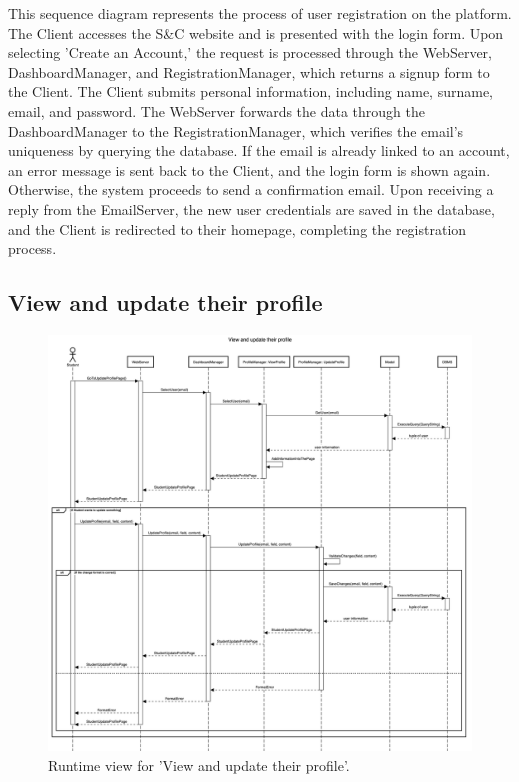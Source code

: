 This sequence diagram represents the process of user registration on the platform. The Client accesses the S\&C website and is presented with the login form. Upon selecting 'Create an Account,' the request is processed through the WebServer, DashboardManager, and RegistrationManager, which returns a signup form to the Client. The Client submits personal information, including name, surname, email, and password. The WebServer forwards the data through the DashboardManager to the RegistrationManager, which verifies the email’s uniqueness by querying the database. If the email is already linked to an account, an error message is sent back to the Client, and the login form is shown again. Otherwise, the system proceeds to send a confirmation email. Upon receiving a reply from the EmailServer, the new user credentials are saved in the database, and the Client is redirected to their homepage, completing the registration process.

\subsection{View and update their profile}
\begin{figure}[H]
    \begin{center}
        \includegraphics[width=0.8\linewidth]{DD/LaTeX/Images/RuntimeView/ViewAndUpdateTheirProfile.png}
        \caption{Runtime view for 'View and update their profile'.}
        \label{fig:runtime_ViewAndUpdateTheirProfile}%
    \end{center}
\end{figure}

